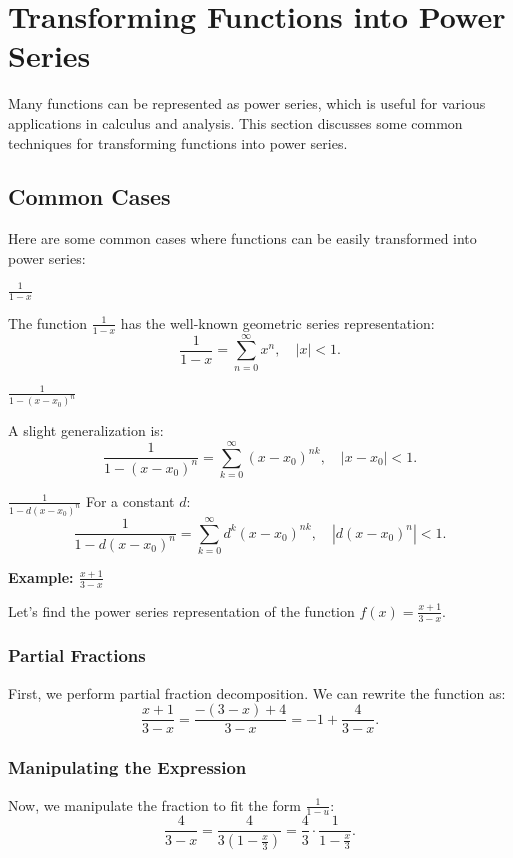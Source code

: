 \newpage
\section{Transforming Functions into Power Series}

Many functions can be represented as power series, which is useful for various applications in calculus and analysis. This section discusses some common techniques for transforming functions into power series.

\subsection{Common Cases}
Here are some common cases where functions can be easily transformed into power series:

\(\frac{1}{1 - x}\)

The function \(\frac{1}{1 - x}\) has the well-known geometric series representation:
\[
\frac{1}{1 - x} = \sum_{n=0}^{\infty} x^n, \quad |x| < 1.
\]

\(\frac{1}{1 - {(x - x_0)}^n}\)

A slight generalization is:
\[
\frac{1}{1 - {(x - x_0)}^n} = \sum_{k=0}^{\infty} {(x - x_0)}^{nk}, \quad |x - x_0| < 1.
\]

\(\frac{1}{1 - d{(x - x_0)}^n}\)
For a constant \(d\):
\[
\frac{1}{1 - d{(x - x_0)}^n} = \sum_{k=0}^{\infty} d^k {(x - x_0)}^{nk}, \quad |d{(x - x_0)}^n| < 1.
\]

\textbf{Example: \(\frac{x + 1}{3 - x}\)}
\vspace{\baselineskip}

Let's find the power series representation of the function \(f(x) = \frac{x + 1}{3 - x}\).

\subsubsection{Partial Fractions}

First, we perform partial fraction decomposition. We can rewrite the function as:
\[
\frac{x + 1}{3 - x} = \frac{-(3 - x) + 4}{3 - x} = -1 + \frac{4}{3 - x}.
\]

\subsubsection{Manipulating the Expression}
Now, we manipulate the fraction to fit the form \(\frac{1}{1 - u}\):
\[
\frac{4}{3 - x} = \frac{4}{3(1 - \frac{x}{3})} = \frac{4}{3} \cdot \frac{1}{1 - \frac{x}{3}}.
\]

